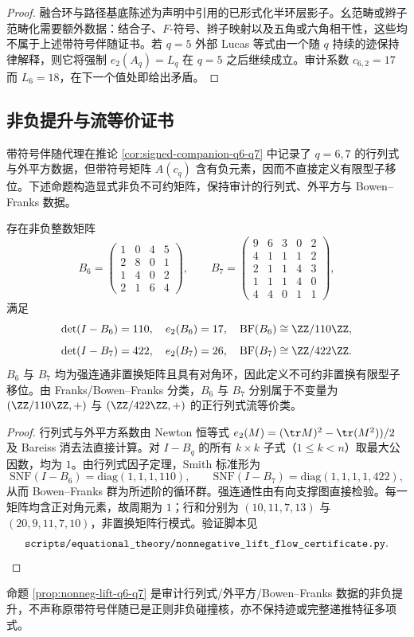 \documentclass[../../main.tex]{subfiles}
\begin{document}
\begin{proof}
融合环与路径基底陈述为声明中引用的已形式化半环层影子。幺范畴或辫子范畴化需要额外数据：结合子、\(F\)-符号、辫子映射以及五角或六角相干性，这些均不属于上述带符号伴随证书。若 \(q=5\) 外部 Lucas 等式由一个随 \(q\) 持续的迹保持律解释，则它将强制 \(e_2(A_q)=L_q\) 在 \(q=5\) 之后继续成立。审计系数 \(c_{6,2}=17\) 而 \(L_6=18\)，在下一个值处即给出矛盾。
\end{proof}

\subsection{非负提升与流等价证书}

带符号伴随代理在推论 \ref{cor:signed-companion-q6-q7} 中记录了 \(q=6,7\) 的行列式与外平方数据，但带符号矩阵 \(A(c_q)\) 含有负元素，因而不直接定义有限型子移位。下述命题构造显式非负不可约矩阵，保持审计的行列式、外平方与 Bowen--Franks 数据。

\begin{proposition}[非负 \(q=6,7\) 提升]\label{prop:nonneg-lift-q6-q7}
存在非负整数矩阵
\[
B_6=
\begin{pmatrix}
1&0&4&5\\
2&8&0&1\\
1&4&0&2\\
2&1&6&4
\end{pmatrix},
\qquad
B_7=
\begin{pmatrix}
9&6&3&0&2\\
4&1&1&1&2\\
2&1&1&4&3\\
1&1&1&4&0\\
4&4&0&1&1
\end{pmatrix},
\]
满足
\[
    \det(I-B_6)=110,\quad e_2(B_6)=17,\quad \mathrm{BF}(B_6)\cong \ZZ/110\ZZ,
\]
\[
    \det(I-B_7)=422,\quad e_2(B_7)=26,\quad \mathrm{BF}(B_7)\cong \ZZ/422\ZZ.
\]
\(B_6\) 与 \(B_7\) 均为强连通非置换矩阵且具有对角环，因此定义不可约非置换有限型子移位。由 Franks/Bowen--Franks 分类，\(B_6\) 与 \(B_7\) 分别属于不变量为 \((\ZZ/110\ZZ,+)\) 与 \((\ZZ/422\ZZ,+)\) 的正行列式流等价类。
\end{proposition}

\begin{proof}
行列式与外平方系数由 Newton 恒等式 \(e_2(M)=(\tr M)^2-\tr(M^2))/2\) 及 Bareiss 消去法直接计算。对 \(I-B_q\) 的所有 \(k\times k\) 子式（\(1\leq k<n\)）取最大公因数，均为 \(1\)。由行列式因子定理，Smith 标准形为
\[
    \mathrm{SNF}(I-B_6)=\mathrm{diag}(1,1,1,110),\qquad
    \mathrm{SNF}(I-B_7)=\mathrm{diag}(1,1,1,1,422),
\]
从而 Bowen--Franks 群为所述阶的循环群。强连通性由有向支撑图直接检验。每一矩阵均含正对角元素，故周期为 \(1\)；行和分别为 \((10,11,7,13)\) 与 \((20,9,11,7,10)\)，非置换矩阵行模式。验证脚本见
\[
    \texttt{\detokenize{scripts/equational_theory/nonnegative_lift_flow_certificate.py}}.
\]
\end{proof}

\begin{remark}[提升边界]\label{rem:nonneg-lift-scope}
命题 \ref{prop:nonneg-lift-q6-q7} 是审计行列式/外平方/Bowen--Franks 数据的非负提升，不声称原带符号伴随已是正则非负碰撞核，亦不保持迹或完整递推特征多项式。
\end{remark}
\end{document}
